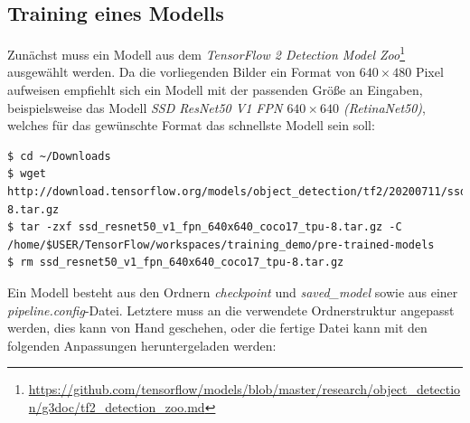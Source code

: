 \documentclass[12pt, oneside]{article}
\begin{document}
\subsection{Training eines Modells}\label{ssec: Training eines Modells}

Zunächst muss ein Modell aus dem \textit{TensorFlow 2 Detection Model Zoo}\footnote{\href{{https://github.com/tensorflow/models/blob/master/research/object_detection/g3doc/tf2_detection_zoo.md}}{\url{https://github.com/tensorflow/models/blob/master/research/object_detection/g3doc/tf2_detection_zoo.md}}} ausgewählt werden. Da die vorliegenden Bilder ein Format von $640\times480$ Pixel aufweisen empfiehlt sich ein Modell mit der passenden Größe an Eingaben, beispielsweise das Modell \textit{SSD ResNet50 V1 FPN $640\times640$ (RetinaNet50)}, welches für das gewünschte Format das schnellste Modell sein soll:

\begin{verbatim}
$ cd ~/Downloads
$ wget http://download.tensorflow.org/models/object_detection/tf2/20200711/ssd_resnet50_v1_fpn_640x640_coco17_tpu-8.tar.gz
$ tar -zxf ssd_resnet50_v1_fpn_640x640_coco17_tpu-8.tar.gz -C /home/$USER/TensorFlow/workspaces/training_demo/pre-trained-models
$ rm ssd_resnet50_v1_fpn_640x640_coco17_tpu-8.tar.gz
\end{verbatim}    
Ein Modell besteht aus den Ordnern \textit{checkpoint} und \textit{saved\_model} sowie aus einer \textit{pipe\-line.config}-Datei. Letztere muss an die verwendete Ordnerstruktur angepasst werden, dies kann von Hand geschehen, oder die fertige Datei kann mit den folgenden Anpassungen heruntergeladen werden:
\end{document}
